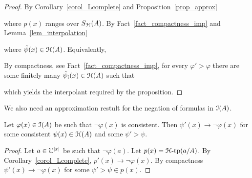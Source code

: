 \documentclass[10pt,oneside]{amsproc}
\begin{document}
\begin{proof}
  By Corollary~\ref{corol_Lcomplete} and Proposition~\ref{prop_approx}


  where $p(x)$ ranges over $S_{\EuScript H}(A)$.
  By Fact~\ref{fact_compactness_imp} and Lemma~\ref{lem_interpolation}


  where $\tilde{\psi}(x)\in{\EuScript H}(A)$.
  Equivalently,


  By compactness, see Fact~\ref{fact_compactness_imp}, for every $\varphi'>\varphi$ there are some finitely many $\tilde{\psi}_i(x)\in{\EuScript H}(A)$ such that


  which yields the interpolant required by the proposition.
\end{proof}

We also need an approximation restult for the negation of formulas in ${\EuScript I}(A)$.

\begin{proposition}\label{prop_LHapprox2}
  Let $\varphi(x)\in{\EuScript I}(A)$ be such that $\neg\varphi(x)$ is consistent.
  Then  $\psi'(x)\rightarrow\neg\varphi(x)$ for some consistent $\psi(x)\in{\EuScript H}(A)$ and some $\psi'>\psi$.
\end{proposition}



\begin{proof}
  Let $a\in {\EuScript U}^{|x|}$ be such that $\neg\varphi(a)$.
  Let $p(x)={\EuScript H}\mbox{-tp}(a/A)$.
  By Corollary~\ref{corol_Lcomplete}, $p'(x)\rightarrow\neg\varphi(x)$. 
  By compactness  $\psi'(x)\rightarrow\neg\varphi(x)$ for some $\psi'>\psi\in p(x)$. 
\end{proof}
\end{document}
